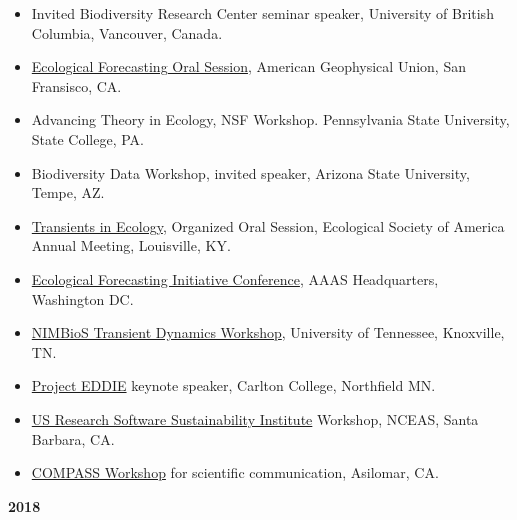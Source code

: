 \documentclass[10pt,sans]{moderncv}        %
\providecommand{\tightlist}{%
    \setlength{\itemsep}{0pt}\setlength{\parskip}{0pt}}
\begin{document}
\begin{itemize}
\tightlist
\item
  Invited Biodiversity Research Center seminar speaker, University of
  British Columbia, Vancouver, Canada.
\item
  \href{https://agu.confex.com/agu/fm19/meetingapp.cgi/Session/87281}{Ecological
  Forecasting Oral Session}, American Geophysical Union, San Fransisco,
  CA.
\item
  Advancing Theory in Ecology, NSF Workshop. Pennsylvania State
  University, State College, PA.
\item
  Biodiversity Data Workshop, invited speaker, Arizona State University,
  Tempe, AZ.
\item
  \href{https://eco.confex.com/eco/2019/meetingapp.cgi/Session/15321}{Transients
  in Ecology}, Organized Oral Session, Ecological Society of America
  Annual Meeting, Louisville, KY.
\item
  \href{https://ecoforecast.org/efi2019/}{Ecological Forecasting
  Initiative Conference}, AAAS Headquarters, Washington DC.
\item
  \href{http://www.nimbios.org/workshops/WS_transients}{NIMBioS
  Transient Dynamics Workshop}, University of Tennessee, Knoxville, TN.
\item
  \href{https://serc.carleton.edu/eddie/earthecosystems/eddieevents/workshops/barriers_solutions/index.html}{Project
  EDDIE} keynote speaker, Carlton College, Northfield MN.
\item
  \href{https://github.com/si2-urssi/software-credit}{US Research
  Software Sustainability Institute} Workshop, NCEAS, Santa Barbara, CA.
\item
  \href{https://www.compassscicomm.org}{COMPASS Workshop} for scientific
  communication, Asilomar, CA.
\end{itemize}

\textbf{2018}
\end{document}
